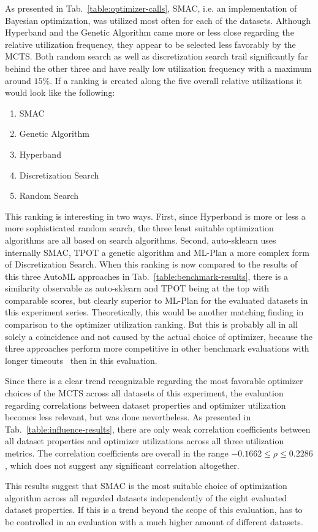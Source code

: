 As presented in Tab.~\ref{table:optimizer-calls}, SMAC, i.e. an implementation of Bayesian optimization, was utilized most often for each of the datasets.
Although Hyperband and the Genetic Algorithm came more or less close regarding the relative utilization frequency, they appear to be selected less favorably by the MCTS.
Both random search as well as discretization search trail significantly far behind the other three and have really low utilization frequency with a maximum around $15\%$.\newline
If a ranking is created along the five overall relative utilizations it would look like the following:
\begin{enumerate}
    \item SMAC
    \item Genetic Algorithm
    \item Hyperband
    \item Discretization Search
    \item Random Search
\end{enumerate}
This ranking is interesting in two ways.
First, since Hyperband is more or less a more sophisticated random search, the three least suitable optimization algorithms are all based on search algorithms.\newline
Second, auto-sklearn uses internally SMAC, TPOT a genetic algorithm and ML-Plan a more complex form of Discretization Search.
When this ranking is now compared to the results of this three AutoML approaches in Tab.~\ref{table:benchmark-results}, there is a similarity observable as auto-sklearn and TPOT being at the top with comparable scores, but clearly superior to ML-Plan for the evaluated datasets in this experiment series.
Theoretically, this would be another matching finding in comparison to the optimizer utilization ranking.
But this is probably all in all solely a coincidence and not caused by the actual choice of optimizer, because the three approaches perform more competitive in other benchmark evaluations with longer timeouts~\cite{Mohr-ML-Plan} then in this evaluation.

Since there is a clear trend recognizable regarding the most favorable optimizer choices of the MCTS across all datasets of this experiment, the evaluation regarding correlations between dataset properties and optimizer utilization becomes less relevant, but was done nevertheless.\newline
As presented in Tab.~\ref{table:influence-results}, there are only weak correlation coefficients between all dataset properties and optimizer utilizations across all three utilization metrics.
The correlation coefficients are overall in the range $-0.1662 \leq \rho \leq 0.2286$, which does not suggest any significant correlation altogether.

This results suggest that SMAC is the most suitable choice of optimization algorithm across all regarded datasets independently of the eight evaluated dataset properties.
If this is a trend beyond the scope of this evaluation, has to be controlled in an evaluation with a much higher amount of different datasets.
